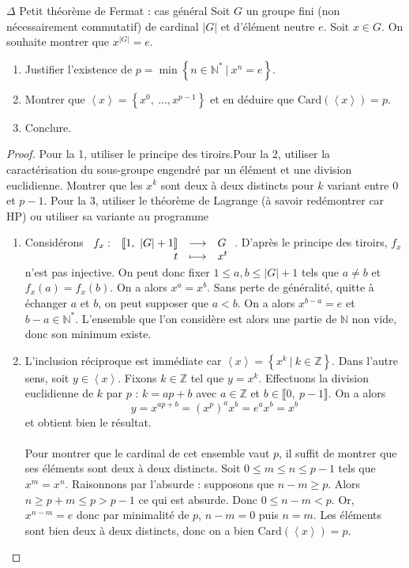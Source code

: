 \documentclass[french,a4paper]{article}
\newcommand{\N}{\mathbb{N}}
\newcommand{\Z}{\mathbb{Z}}
\newcommand{\st}{^*}
\newcommand{\card}{\text{Card}}
\theoremstyle{plain}
\theoremstyle{definition}
\theoremstyle{remark}
\begin{document}
\begin{ex}[Morlot]{$\Delta$ Petit théorème de Fermat : cas général}
	Soit $G$ un groupe fini (non nécessairement commutatif) de cardinal $|G|$ et d'élément neutre $e$. Soit $x \in G$. On souhaite montrer que $x^{|G|}=e$.
	\begin{enumerate}
		\item Justifier l'existence de $p=\min\left\{n \in\N\st \ | \ x^n=e\right\}$.
		\item Montrer que $\left\langle x\right\rangle=\left\{x^0, \ ..., x^{p-1}\right\}$ et en déduire que $\card(\left\langle x\right\rangle)=p$.
		\item Conclure.
	\end{enumerate}
\end{ex}

\begin{proof}
	Pour la 1, utiliser le principe des tiroirs.Pour la 2, utiliser la caractérisation du sous-groupe engendré par un élément et une division euclidienne. Montrer que les $x^k$ sont deux à deux distincts pour $k$ variant entre 0 et $p-1$. Pour la 3, utiliser le théorème de Lagrange (à savoir redémontrer car HP) ou utiliser sa variante au programme
	\begin{enumerate}
		\item Considérons 
		$\begin{array}[t]{lrcl}
			f_x : & \llbracket1, \ |G|+1\rrbracket & \longrightarrow& G \\
			& t & \longmapsto &x^t
		\end{array} $. D'après le principe des tiroirs, $f_x$ n'est pas injective. On peut donc fixer $1 \leqslant a,b \leqslant |G|+1$ tels que $a\ne b$ et $f_x(a)=f_x(b)$. On a alors $x^a=x^b$. Sans perte de généralité, quitte à échanger $a$ et $b$, on peut supposer que $a<b$. On a alors $x^{b-a}=e$ et $b-a \in \N\st$. L'ensemble que l'on considère est alors une partie de $\N$ non vide, donc son minimum existe.
		\item L'inclusion réciproque est immédiate car $\left\langle x\right\rangle=\left\{x^k \ | \ k \in\Z\right\}$. Dans l'autre sens, soit $y\in \left\langle x\right\rangle$. Fixons $k\in\Z$ tel que $y=x^k$. Effectuons la division euclidienne de $k$ par $p$ : $k=ap +b$ avec $a\in\Z$ et $b\in\llbracket0, \ p-1\rrbracket$. On a alors $$y=x^{ap+b}=(x^p)^ax^b=e^ax^b=x^b$$ et obtient bien le résultat.
		\\ \\ Pour montrer que le cardinal de cet ensemble vaut $p$, il suffit de montrer que ses éléments sont deux à deux distincts.  Soit $0 \leqslant m \leqslant n \leqslant p-1$ tels que $x^m=x^n$. Raisonnons par l'absurde : supposons que $n-m \geqslant p$. Alors $n\geqslant p+m \leqslant p > p-1$ ce qui est absurde. Donc $0 \leqslant n-m <p$. Or, $x^{n-m}=e$ donc par minimalité de $p$, $n-m=0$ puis $n=m$. Les éléments sont bien deux à deux distincts, donc on a bien $\card(\left\langle x\right\rangle)=p$.

\end{enumerate}
\end{proof}
\end{document}
